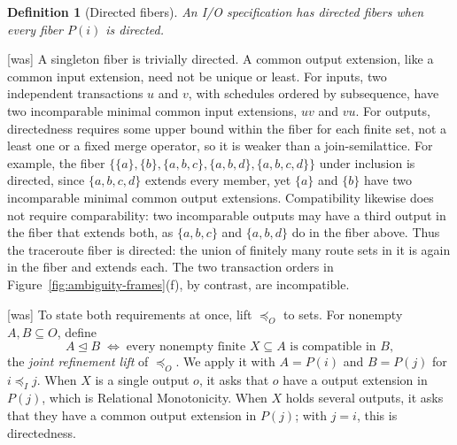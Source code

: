 \documentclass[sigconf]{cidr-2027}
\newtheorem{definition}{Definition}
\theoremstyle{remark}
\newcommand{\InputOrd}{\preceq_I}
\newcommand{\OutputOrd}{\preceq_O}
\newcommand{\LiftedOrd}{\trianglelefteq}
\newcommand{\indesc}{input extension\xspace} %
\newcommand{\indescs}{input extensions\xspace}
\newcommand{\outrel}{extends\xspace}          %
\newcommand{\outnoun}{output extension\xspace}%
\newcommand{\outnouns}{output extensions\xspace}
\newcommand{\spectype}[1][]{I/O specification#1\xspace}
\newcommand{\fiber}[1]{P(#1)}
\begin{document}
\begin{definition}[Directed fibers]
\label{def:directed-outputs}
An \spectype has \emph{directed fibers} when every
fiber $\fiber{i}$ is directed.
\end{definition}



{\footnotesize\color{black!50}\noindent\textsf{[was]} A singleton fiber is trivially directed.  A common \outnoun, like a common
\indesc, need not be unique or least.  For inputs, two independent transactions
$u$ and $v$, with schedules ordered by subsequence, have two incomparable
minimal common \indescs, $uv$ and $vu$.  For outputs, directedness requires some upper bound within the fiber for each finite
set, not a least one or a fixed merge operator, so it is weaker than a
join-semilattice.  For example, the fiber
$\{\{a\},\{b\},\{a,b,c\},\{a,b,d\},\{a,b,c,d\}\}$ under inclusion is directed,
since $\{a,b,c,d\}$ \outrel every member, yet $\{a\}$ and $\{b\}$ have two
incomparable minimal common \outnouns.  Compatibility likewise does not require
comparability: two incomparable outputs may have a third output in the fiber
that \outrel both, as $\{a,b,c\}$ and $\{a,b,d\}$ do in the fiber above.  Thus
the traceroute fiber is directed: the union of finitely many route sets in it is again in the fiber and extends each. The two transaction orders in
Figure~\ref{fig:ambiguity-frames}(f), by contrast, are incompatible.\par}



{\footnotesize\color{black!50}\noindent\textsf{[was]} To state both requirements at once, lift $\OutputOrd$ to sets.  For nonempty
$A,B\subseteq O$, define
        \begin{equation}
  A\LiftedOrd B
  \;\Longleftrightarrow\;
  \text{every nonempty finite }X\subseteq A\text{ is compatible in }B,
        \end{equation}
the \emph{joint refinement lift} of $\OutputOrd$.  We apply it with $A=\fiber{i}$ and
$B=\fiber{j}$ for $i\InputOrd j$.  When $X$ is a single output $o$, it asks
that $o$ have a \outnoun in $\fiber{j}$, which is Relational Monotonicity.
When $X$ holds several outputs, it asks that they have a common \outnoun in
$\fiber{j}$; with $j=i$, this is directedness.\par}
\end{document}
